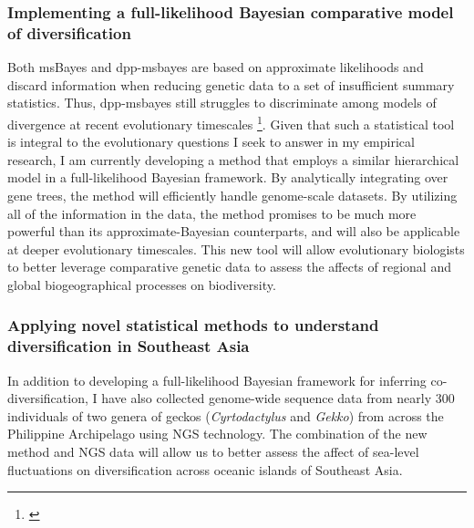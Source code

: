 \subsubsection*{Implementing a full-likelihood Bayesian comparative
    model of diversification}
Both msBayes and dpp-msbayes are based on approximate likelihoods and discard
information when reducing genetic data to a set of insufficient summary
statistics.
Thus, dpp-msbayes still struggles to discriminate among models of divergence at
recent evolutionary timescales \footnote{\label{Oaks14dpp}}.
Given that such a statistical tool is integral to the evolutionary questions
I seek to answer in my empirical research,
I am currently developing a method that employs a similar hierarchical model in
a full-likelihood Bayesian framework.
By analytically integrating over gene trees, the method will efficiently handle
genome-scale datasets.
By utilizing all of the information in the data, the method promises to be much
more powerful than its approximate-Bayesian counterparts, and will also be
applicable at deeper evolutionary timescales.
This new tool will allow evolutionary biologists to better leverage comparative
genetic data to assess the affects of regional and global biogeographical
processes on biodiversity.

\subsubsection*{Applying novel statistical methods to understand diversification
    in Southeast Asia}
In addition to developing a full-likelihood Bayesian framework for inferring
co-diversification, I have also collected genome-wide sequence data from nearly
300 individuals of two genera of geckos (\emph{Cyrtodactylus} and \emph{Gekko})
from across the Philippine Archipelago using NGS technology.
The combination of the new method and NGS data will allow us to better assess
the affect of sea-level fluctuations on diversification across oceanic islands
of Southeast Asia.

